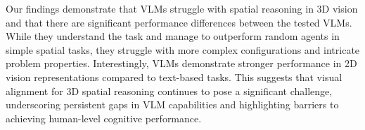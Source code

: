 Our findings demonstrate that VLMs struggle with spatial reasoning in 3D vision and that there are significant performance differences between the tested VLMs. While they understand the task and manage to outperform random agents in simple spatial tasks, they struggle with more complex configurations and intricate problem properties. Interestingly, VLMs demonstrate stronger performance in 2D vision representations compared to text-based tasks. This suggests that visual alignment for 3D spatial reasoning continues to pose a significant challenge, underscoring persistent gaps in VLM capabilities and highlighting barriers to achieving human-level cognitive performance.